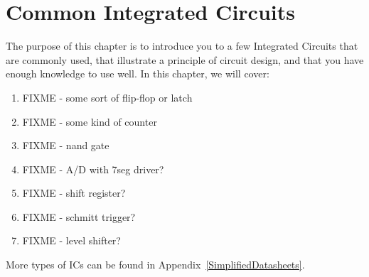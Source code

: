 \chapter{Common Integrated Circuits}

The purpose of this chapter is to introduce you to a few Integrated Circuits that are commonly used, that illustrate a principle of circuit design, and that you have enough knowledge to use well.
In this chapter, we will cover:
\begin{enumerate}
\item FIXME - some sort of flip-flop or latch
\item FIXME - some kind of counter
\item FIXME - nand gate
\item FIXME - A/D with 7seg driver?
\item FIXME - shift register?
\item FIXME - schmitt trigger?
\item FIXME - level shifter?
\end{enumerate}

More types of ICs can be found in Appendix~\ref{SimplifiedDatasheets}.
